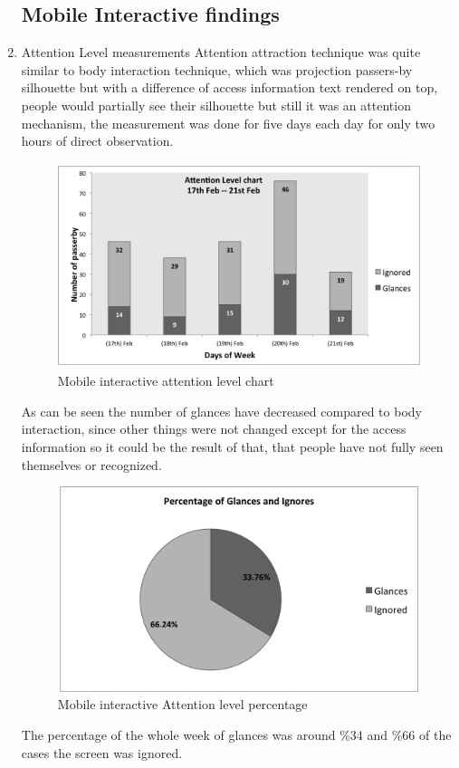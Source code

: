 \begin{enumerate}
\begin{itemize}
\end{itemize}




\newpage
\subsection{Mobile Interactive findings}


\item Attention Level measurements
Attention attraction technique was quite similar to body interaction technique, which was projection passers-by silhouette but with a difference of access information text rendered on top, people would partially see their silhouette but still it was an attention mechanism, the measurement was done for five days each day for only two hours of direct observation. 


\begin{figure}[H]
    \centering
    \includegraphics[width=110mm,height=60mm]{Figures/8/mobile_inter_findings/mobile_Inter_chart}%
    \caption{Mobile interactive attention level chart}%
    \label{fig:mobileattentionlevelchart}%
\end{figure}

As can be seen the number of glances have decreased compared to body interaction, since other things were not changed except for the access information so it could be the result of that, that people have not fully seen themselves or recognized. 

\begin{figure}[H]
    \centering
    \includegraphics[width=110mm,height=60mm]{Figures/8/mobile_inter_findings/mobile_inter_percentage}
    \caption{Mobile interactive Attention level percentage}%
    \label{fig:bodyattentionlevelpercentage}%
\end{figure}
The percentage of the whole week of glances was around \%34 and \%66 of the cases the screen was ignored.


\end{enumerate}
